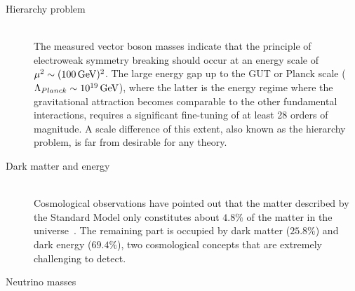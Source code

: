 \begin{myindentpar}
\begin{description}
    \item[Hierarchy problem] \hfill \\
    The measured vector boson masses indicate that the principle of electroweak symmetry breaking should occur at an energy scale of $\mu^{2} \sim (100 \, \mathrm{GeV})^{2}$.
    The large energy gap up to the GUT or Planck scale ($\Lambda_{Planck} \sim 10^{19} \, \mathrm{GeV}$), where the latter is the energy regime where the gravitational attraction becomes comparable to the other fundamental interactions, requires a significant fine-tuning of at least 28 orders of magnitude. 
    A scale difference of this extent, also known as the hierarchy problem, is far from desirable for any theory.
    
    \item[Dark matter and energy] \hfill \\
    Cosmological observations have pointed out that the matter described by the Standard Model only constitutes about $4.8 \%$ of the matter in the universe~\cite{PlanckResults}. The remaining part is occupied by dark matter ($25.8 \%$) and dark energy ($69.4 \%$), two cosmological concepts that are extremely challenging to detect.
    
    
    \item[Neutrino masses] \hfill \\
    
   \end{description}
\end{myindentpar}
